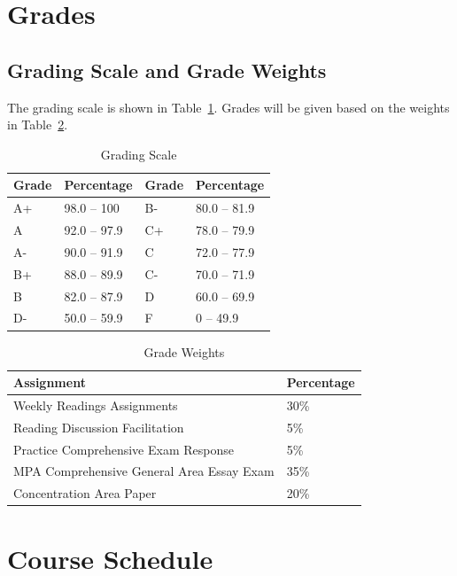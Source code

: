 \documentclass[12pt, letterpaper]{article}
\begin{document}
\section{Grades}


\subsection*{Grading Scale and Grade Weights}  

The grading scale is shown in Table~\ref{tab:grading-scale}. Grades will be given based on the weights in Table~\ref{tab:grade-weights}.

\begin{table}[h]
\centering
\caption{Grading Scale}
\begin{tabular}{llll}
\toprule
\textbf{Grade} & \textbf{Percentage} & \textbf{Grade} & \textbf{Percentage} \\
\midrule
A+ & 98.0 -- 100 & B- & 80.0 -- 81.9\\
A & 92.0 -- 97.9 & C+ & 78.0 -- 79.9\\
A- & 90.0 -- 91.9 & C & 72.0 -- 77.9\\
B+ & 88.0 -- 89.9 & C- & 70.0 -- 71.9\\
B & 82.0 -- 87.9 & D & 60.0 -- 69.9\\
D- & 50.0 -- 59.9 & F & 0 -- 49.9\\

\bottomrule
\end{tabular}
\label{tab:grading-scale}
\end{table}

\begin{table}[h!]
    \centering
    \caption{Grade Weights}
    \begin{tabular}{ll}
        \toprule
    \textbf{Assignment} & \textbf{Percentage} \\
    \midrule
    Weekly Readings Assignments & 30\% \\
    Reading Discussion Facilitation & 5\% \\
    Practice Comprehensive Exam Response & 5\% \\
    MPA Comprehensive General Area Essay Exam & 35\% \\
    Concentration Area Paper & 20\% \\
    \bottomrule
    \end{tabular}
    \label{tab:grade-weights}
\end{table}

\section{Course Schedule}
\end{document}
